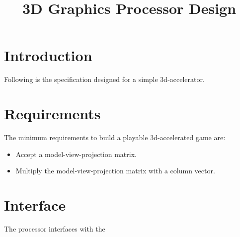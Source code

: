 \documentclass[10pt]{article}
\title{3D Graphics Processor Design}
\date{}
\begin{document}
	\maketitle
	\tableofcontents
	\pagebreak
	\setlength{\parindent}{0cm}
	
	\section{Introduction}
	
	Following is the specification designed for a simple 3d-accelerator.
	
	\section{Requirements}
	
	The minimum requirements to build a playable 3d-accelerated game are:
	\begin{itemize}
		\item Accept a model-view-projection matrix.
		\item Multiply the model-view-projection matrix with a column vector.
	\end{itemize}
	
	\section{Interface}
	
	The processor interfaces with the 
	
\end{document}
